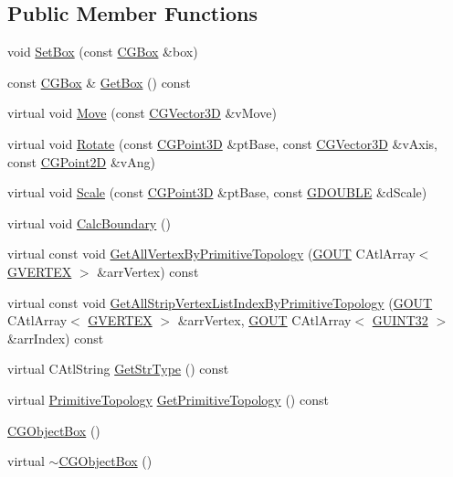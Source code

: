 \subsection*{Public Member Functions}
\begin{DoxyCompactItemize}
\item 
void \hyperlink{class_c_g_object_box_a4dc621e83fd3d373fac4bb8f89f5b0e5}{Set\+Box} (const \hyperlink{class_c_g_box}{C\+G\+Box} \&box)
\item 
const \hyperlink{class_c_g_box}{C\+G\+Box} \& \hyperlink{class_c_g_object_box_adee59da28bce99ebd31c2adc6f242fa1}{Get\+Box} () const 
\item 
virtual void \hyperlink{class_c_g_object_box_ab9c283d92715d0f7c47f116df393bb26}{Move} (const \hyperlink{_g_point3_d_8h_aa7e73d39f4c991acb5a13c84b498366d}{C\+G\+Vector3\+D} \&v\+Move)
\item 
virtual void \hyperlink{class_c_g_object_box_a5055a2fc9c1822889fdf8d88ed1f545b}{Rotate} (const \hyperlink{class_c_g_point3_d}{C\+G\+Point3\+D} \&pt\+Base, const \hyperlink{_g_point3_d_8h_aa7e73d39f4c991acb5a13c84b498366d}{C\+G\+Vector3\+D} \&v\+Axis, const \hyperlink{class_c_g_point2_d}{C\+G\+Point2\+D} \&v\+Ang)
\item 
virtual void \hyperlink{class_c_g_object_box_a505453fcb6129e56da601074f41d1b5c}{Scale} (const \hyperlink{class_c_g_point3_d}{C\+G\+Point3\+D} \&pt\+Base, const \hyperlink{_g_types_8h_afd05ac85f90ee8e2a733928545462cd4}{G\+D\+O\+U\+B\+L\+E} \&d\+Scale)
\item 
virtual void \hyperlink{class_c_g_object_box_aeee2539ce593f02eacff53a5b3fab594}{Calc\+Boundary} ()
\item 
virtual const void \hyperlink{class_c_g_object_box_aef3cbcc5140c7b636b06abe214e123a5}{Get\+All\+Vertex\+By\+Primitive\+Topology} (\hyperlink{_g_types_8h_a0858ec221262e635612871d70ca233ad}{G\+O\+U\+T} C\+Atl\+Array$<$ \hyperlink{struct_g_v_e_r_t_e_x}{G\+V\+E\+R\+T\+E\+X} $>$ \&arr\+Vertex) const 
\item 
virtual const void \hyperlink{class_c_g_object_box_ae4d7052d9a188de08fec7e5142b6eb39}{Get\+All\+Strip\+Vertex\+List\+Index\+By\+Primitive\+Topology} (\hyperlink{_g_types_8h_a0858ec221262e635612871d70ca233ad}{G\+O\+U\+T} C\+Atl\+Array$<$ \hyperlink{struct_g_v_e_r_t_e_x}{G\+V\+E\+R\+T\+E\+X} $>$ \&arr\+Vertex, \hyperlink{_g_types_8h_a0858ec221262e635612871d70ca233ad}{G\+O\+U\+T} C\+Atl\+Array$<$ \hyperlink{_g_types_8h_a2e1a1c77d1349057202e2f34e071019c}{G\+U\+I\+N\+T32} $>$ \&arr\+Index) const 
\item 
virtual C\+Atl\+String \hyperlink{class_c_g_object_box_a783a8fdbe4d892defa672ab08e288606}{Get\+Str\+Type} () const 
\item 
virtual \hyperlink{_g_types_8h_a940e3da6a9b57aae3de0b050e2a7af5e}{Primitive\+Topology} \hyperlink{class_c_g_object_box_a821d5518513d9a8ddd75b0beedf03c42}{Get\+Primitive\+Topology} () const 
\item 
\hyperlink{class_c_g_object_box_ae5570838fc019cccb7f7afb4cbfeeeb4}{C\+G\+Object\+Box} ()
\item 
virtual \hyperlink{class_c_g_object_box_af669f6b044ae945121e6db40b97c3d0a}{$\sim$\+C\+G\+Object\+Box} ()
\end{DoxyCompactItemize}
